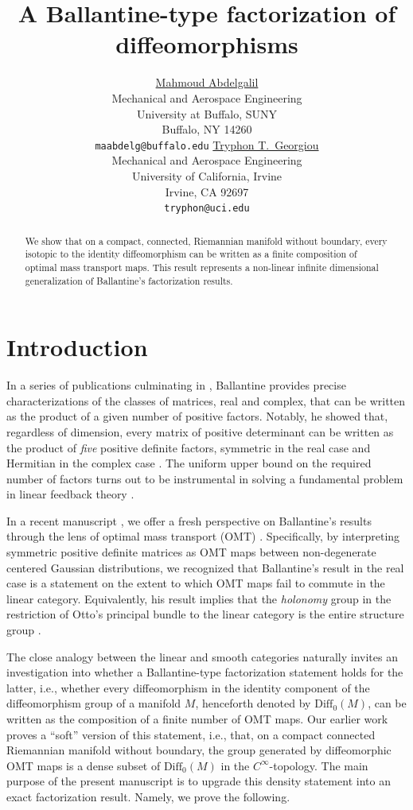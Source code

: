 \documentclass{article}
\author{\href{https://orcid.org/0000-0003-1932-5115}{Mahmoud  Abdelgalil} \\
	Mechanical and Aerospace Engineering\\
	University at Buffalo, SUNY\\
	Buffalo, NY 14260 \\
	\texttt{maabdelg@buffalo.edu} 
	\And
	\href{https://orcid.org/0000-0003-0012-5447}{Tryphon T.~Georgiou} \\
	Mechanical and Aerospace Engineering\\
	University of California, Irvine\\
	Irvine, CA 92697\\
	\texttt{tryphon@uci.edu}
}
\date{}
\title{A Ballantine-type factorization of diffeomorphisms}
\theoremstyle{remark}
\newcommand{\M}{M}
\newcommand{\Diff}{\mathrm{Diff}_0(\M)}
\begin{document}
\maketitle

\begin{abstract}
We show that on a compact, connected, Riemannian manifold without boundary, every isotopic to the identity diffeomorphism can be written as a finite composition of optimal mass transport maps. This result represents a non-linear infinite dimensional generalization of Ballantine's factorization results.
\end{abstract}



\section{Introduction}

In a series of publications culminating in \cite {ballantine1968bproducts,Ballantine1970}, Ballantine provides precise characterizations of the classes of matrices, real and complex, that can be written as the product of a given number of positive factors. Notably, he showed that, regardless of dimension, every matrix of positive determinant can be written as the product of \emph{five} positive definite factors, symmetric in the real case \cite{ballantine1968bproducts} and Hermitian in the complex case \cite{Ballantine1970}. The uniform upper bound on the required number of factors turns out to be instrumental in solving a fundamental problem in linear feedback theory \cite{AbdelgalilGeorgiou2026TAC}. 
%

%
In a recent manuscript \cite{AbdelgalilGeorgiou2026}, we offer a fresh perspective on Ballantine's results through the lens of optimal mass transport (OMT) \cite{Villani2009}. Specifically, by interpreting symmetric positive definite matrices as OMT maps between non-degenerate centered Gaussian distributions, we recognized that Ballantine's result in the real case is a statement on the extent to which OMT maps fail to commute in the linear category. Equivalently, his result implies that the \emph{holonomy} group in the restriction of Otto's principal bundle \cite{otto2001geometry} to the linear category \cite{modin2017geometry} is the entire structure group \cite{AbdelgalilGeorgiou2025}. 
%

%
The close analogy between the linear and smooth categories \cite{modin2017geometry,khesin2024information} naturally invites an investigation into whether a Ballantine-type factorization statement holds for the latter, i.e., whether every diffeomorphism in the identity component of the diffeomorphism group of a manifold $\M$, henceforth denoted by $\Diff$, can be written as the composition of a finite number of OMT maps. Our earlier work \cite[Theorem 7]{abdelgalil2026holonomy} proves a ``soft'' version of this statement, i.e., that, on a compact connected Riemannian manifold without boundary, the group generated by diffeomorphic OMT maps is a dense subset of $\Diff$ in the $C^\infty$-topology. The main purpose of the present manuscript is to upgrade this density statement into an exact factorization result. Namely, we prove the following.
%
\end{document}
